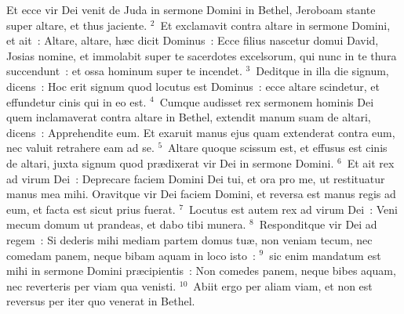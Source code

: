 \lettrine[lines=10,image=true,loversize=0.05,lraise=-0.03]{E}{}t ecce vir Dei venit de Juda in sermone Domini in Bethel, Jeroboam stante super altare, et thus jaciente.
${}^{2}$~Et exclamavit contra altare in sermone Domini, et ait~: Altare, altare, h\ae c dicit Dominus~: Ecce filius nascetur domui David, Josias nomine, et immolabit super te sacerdotes excelsorum, qui nunc in te thura succendunt~: et ossa hominum super te incendet.
${}^{3}$~Deditque in illa die signum, dicens~: Hoc erit signum quod locutus est Dominus~: ecce altare scindetur, et effundetur cinis qui in eo est.
${}^{4}$~Cumque audisset rex sermonem hominis Dei quem inclamaverat contra altare in Bethel, extendit manum suam de altari, dicens~: Apprehendite eum. Et exaruit manus ejus quam extenderat contra eum, nec valuit retrahere eam ad se.
${}^{5}$~Altare quoque scissum est, et effusus est cinis de altari, juxta signum quod pr\ae dixerat vir Dei in sermone Domini.
${}^{6}$~Et ait rex ad virum Dei~: Deprecare faciem Domini Dei tui, et ora pro me, ut restituatur manus mea mihi. Oravitque vir Dei faciem Domini, et reversa est manus regis ad eum, et facta est sicut prius fuerat.
${}^{7}$~Locutus est autem rex ad virum Dei~: Veni mecum domum ut prandeas, et dabo tibi munera.
${}^{8}$~Responditque vir Dei ad regem~: Si dederis mihi mediam partem domus tu\ae , non veniam tecum, nec comedam panem, neque bibam aquam in loco isto~:
${}^{9}$~sic enim mandatum est mihi in sermone Domini pr\ae cipientis~: Non comedes panem, neque bibes aquam, nec reverteris per viam qua venisti.
${}^{10}$~Abiit ergo per aliam viam, et non est reversus per iter quo venerat in Bethel.


